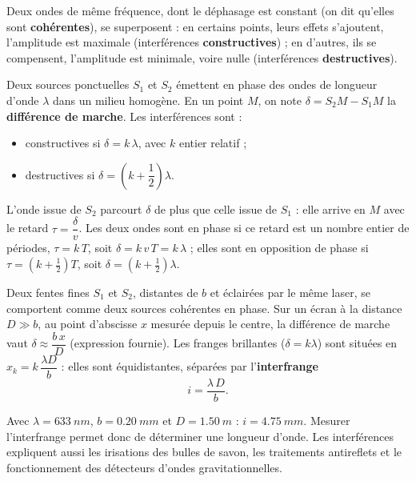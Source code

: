 \begin{definition}[Interférences]
Deux ondes de même fréquence, dont le déphasage est constant (on dit qu'elles sont \textbf{cohérentes}), se superposent :
en certains points, leurs effets s'ajoutent, l'amplitude est maximale (interférences \textbf{constructives}) ; en
d'autres, ils se compensent, l'amplitude est minimale, voire nulle (interférences \textbf{destructives}).
\end{definition}
\begin{propriete}
Deux sources ponctuelles $S_1$ et $S_2$ émettent en phase des ondes de longueur d'onde $\lambda$ dans un milieu
homogène. En un point $M$, on note $\delta=S_2M-S_1M$ la \textbf{différence de marche}. Les interférences sont :
\begin{itemize}
\item constructives si $\delta=k\,\lambda$, avec $k$ entier relatif ;
\item destructives si $\delta=\left(k+\dfrac12\right)\lambda$.
\end{itemize}
\end{propriete}
\begin{savoirfaire}
L'onde issue de $S_2$ parcourt $\delta$ de plus que celle issue de $S_1$ : elle arrive en $M$ avec le retard
$\tau=\dfrac{\delta}{v}$. Les deux ondes sont en phase si ce retard est un nombre entier de périodes, $\tau=k\,T$, soit
$\delta=k\,v\,T=k\,\lambda$ ; elles sont en opposition de phase si $\tau=\left(k+\frac12\right)T$, soit
$\delta=\left(k+\frac12\right)\lambda$.
\end{savoirfaire}
\begin{propriete}
Deux fentes fines $S_1$ et $S_2$, distantes de $b$ et éclairées par le même laser, se comportent comme deux sources
cohérentes en phase. Sur un écran à la distance $D\gg b$, au point d'abscisse $x$ mesurée depuis le centre, la
différence de marche vaut $\delta\approx\dfrac{b\,x}{D}$ (expression fournie). Les franges brillantes ($\delta=k\lambda$)
sont situées en $x_k=k\,\dfrac{\lambda D}{b}$ : elles sont équidistantes, séparées par l'\textbf{interfrange}
\[i=\frac{\lambda\,D}{b}.\]
\end{propriete}
\begin{exemple}
Avec $\lambda=\qty{633}{nm}$, $b=\qty{0,20}{mm}$ et $D=\qty{1,50}{m}$ : $i=\qty{4,75}{mm}$. Mesurer l'interfrange permet donc de
déterminer une longueur d'onde. Les interférences expliquent aussi les irisations des bulles de savon, les traitements
antireflets et le fonctionnement des détecteurs d'ondes gravitationnelles.
\end{exemple}
